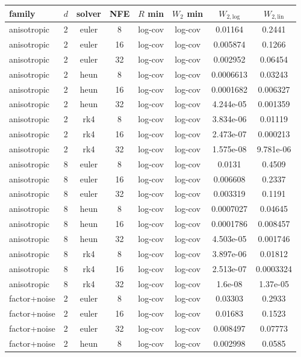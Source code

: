 \begin{tabular}{llcccccc}
\toprule
family & $d$ & solver & NFE & $R$ min & $W_2$ min & $W_{2,\mathrm{log}}$ & $W_{2,\mathrm{lin}}$ \\
\midrule
anisotropic & 2 & euler & 8 & log-cov & log-cov & 0.01164 & 0.2441 \\
anisotropic & 2 & euler & 16 & log-cov & log-cov & 0.005874 & 0.1266 \\
anisotropic & 2 & euler & 32 & log-cov & log-cov & 0.002952 & 0.06454 \\
anisotropic & 2 & heun & 8 & log-cov & log-cov & 0.0006613 & 0.03243 \\
anisotropic & 2 & heun & 16 & log-cov & log-cov & 0.0001682 & 0.006327 \\
anisotropic & 2 & heun & 32 & log-cov & log-cov & 4.244e-05 & 0.001359 \\
anisotropic & 2 & rk4 & 8 & log-cov & log-cov & 3.834e-06 & 0.01119 \\
anisotropic & 2 & rk4 & 16 & log-cov & log-cov & 2.473e-07 & 0.000213 \\
anisotropic & 2 & rk4 & 32 & log-cov & log-cov & 1.575e-08 & 9.781e-06 \\
anisotropic & 8 & euler & 8 & log-cov & log-cov & 0.0131 & 0.4509 \\
anisotropic & 8 & euler & 16 & log-cov & log-cov & 0.006608 & 0.2337 \\
anisotropic & 8 & euler & 32 & log-cov & log-cov & 0.003319 & 0.1191 \\
anisotropic & 8 & heun & 8 & log-cov & log-cov & 0.0007027 & 0.04645 \\
anisotropic & 8 & heun & 16 & log-cov & log-cov & 0.0001786 & 0.008457 \\
anisotropic & 8 & heun & 32 & log-cov & log-cov & 4.503e-05 & 0.001746 \\
anisotropic & 8 & rk4 & 8 & log-cov & log-cov & 3.897e-06 & 0.01812 \\
anisotropic & 8 & rk4 & 16 & log-cov & log-cov & 2.513e-07 & 0.0003324 \\
anisotropic & 8 & rk4 & 32 & log-cov & log-cov & 1.6e-08 & 1.37e-05 \\
factor+noise & 2 & euler & 8 & log-cov & log-cov & 0.03303 & 0.2933 \\
factor+noise & 2 & euler & 16 & log-cov & log-cov & 0.01683 & 0.1523 \\
factor+noise & 2 & euler & 32 & log-cov & log-cov & 0.008497 & 0.07773 \\
factor+noise & 2 & heun & 8 & log-cov & log-cov & 0.002998 & 0.0585 \\

\end{tabular}
